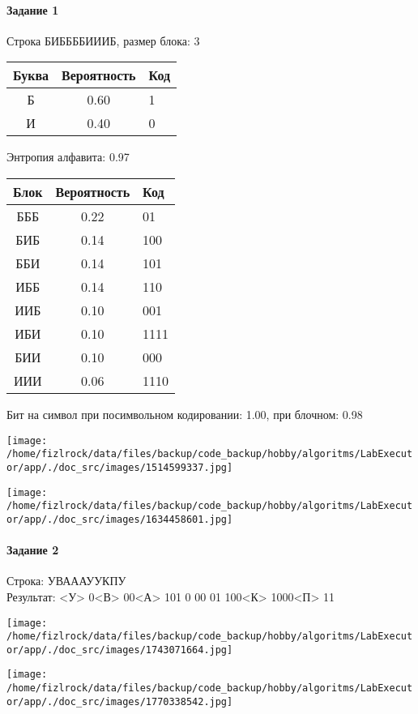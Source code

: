 \documentclass[a4paper, 12pt]{article}
\begin{document}
\paragraph{Задание 1}

Строка БИББББИИИБ, размер блока: 3
\begin{center}
 \begin{tabular}{ |c|c|l| } 
  \hline
     Буква & Вероятность & Код\\ \hline
Б & 0.60 & 1\\\hline
И & 0.40 & 0
\\ \hline \end{tabular}
\end{center}
Энтропия алфавита: 0.97
\begin{center}
 \begin{tabular}{ |c|c|l| } 
  \hline
     Блок & Вероятность & Код\\ \hline
БББ & 0.22 & 01\\\hline
БИБ & 0.14 & 100\\\hline
ББИ & 0.14 & 101\\\hline
ИББ & 0.14 & 110\\\hline
ИИБ & 0.10 & 001\\\hline
ИБИ & 0.10 & 1111\\\hline
БИИ & 0.10 & 000\\\hline
ИИИ & 0.06 & 1110
\\ \hline \end{tabular}
\end{center}
Бит на символ при посимвольном кодировании: 1.00, при блочном: 0.98

\texttt{[image: /home/fizlrock/data/files/backup/code\_backup/hobby/algoritms/LabExecutor/app/./doc\_src/images/1514599337.jpg]}

\texttt{[image: /home/fizlrock/data/files/backup/code\_backup/hobby/algoritms/LabExecutor/app/./doc\_src/images/1634458601.jpg]}
\pagebreak
\paragraph{Задание 2}

Строка: 
УВАААУУКПУ\\
Результат: <У> 0<В> 00<А> 101 0 00 01 100<К> 1000<П> 11

\texttt{[image: /home/fizlrock/data/files/backup/code\_backup/hobby/algoritms/LabExecutor/app/./doc\_src/images/1743071664.jpg]}

\texttt{[image: /home/fizlrock/data/files/backup/code\_backup/hobby/algoritms/LabExecutor/app/./doc\_src/images/1770338542.jpg]}
\end{document}
